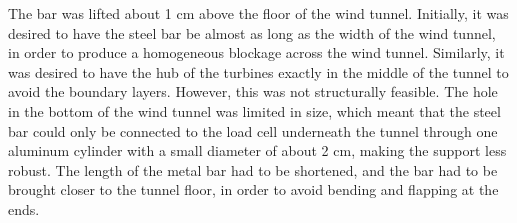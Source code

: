 The bar was lifted about 1 \si{\cm} above the floor of the wind tunnel. Initially, it was desired to have the steel bar be almost as long as the width of the wind tunnel, in order to produce a homogeneous blockage across the wind tunnel. Similarly, it was desired to have the hub of the turbines exactly in the middle of the tunnel to avoid the boundary layers. However, this was not structurally feasible. The hole in the bottom of the wind tunnel was limited in size, which meant that the steel bar could only be connected to the load cell underneath the tunnel through one aluminum cylinder with a small diameter of about 2 \si{\cm}, making the support less robust. The length of the metal bar had to be shortened, and the bar had to be brought closer to the tunnel floor, in order to avoid bending and flapping at the ends.





